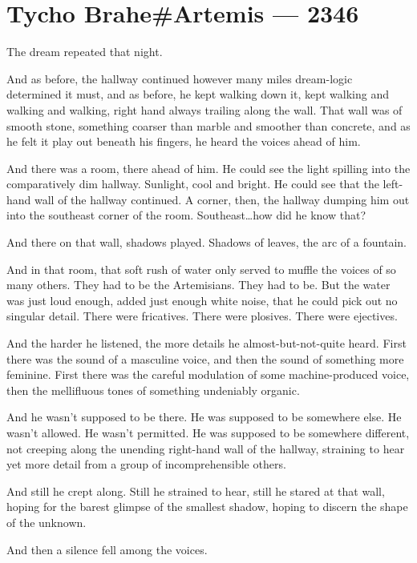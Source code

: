 \hypertarget{tycho-braheartemis-2346}{%
\chapter{Tycho Brahe\#Artemis — 2346}\label{tycho-braheartemis-2346}}

The dream repeated that night.

And as before, the hallway continued however many miles dream-logic determined it must, and as before, he kept walking down it, kept walking and walking and walking, right hand always trailing along the wall. That wall was of smooth stone, something coarser than marble and smoother than concrete, and as he felt it play out beneath his fingers, he heard the voices ahead of him.

And there was a room, there ahead of him. He could see the light spilling into the comparatively dim hallway. Sunlight, cool and bright. He could see that the left-hand wall of the hallway continued. A corner, then, the hallway dumping him out into the southeast corner of the room. Southeast\ldots how did he know that?

And there on that wall, shadows played. Shadows of leaves, the arc of a fountain.

And in that room, that soft rush of water only served to muffle the voices of so many others. They had to be the Artemisians. They had to be. But the water was just loud enough, added just enough white noise, that he could pick out no singular detail. There were fricatives. There were plosives. There were ejectives.

And the harder he listened, the more details he almost-but-not-quite heard. First there was the sound of a masculine voice, and then the sound of something more feminine. First there was the careful modulation of some machine-produced voice, then the mellifluous tones of something undeniably organic.

And he wasn't supposed to be there. He was supposed to be somewhere else. He wasn't allowed. He wasn't permitted. He was supposed to be somewhere different, not creeping along the unending right-hand wall of the hallway, straining to hear yet more detail from a group of incomprehensible others.

And still he crept along. Still he strained to hear, still he stared at that wall, hoping for the barest glimpse of the smallest shadow, hoping to discern the shape of the unknown.

And then a silence fell among the voices.

